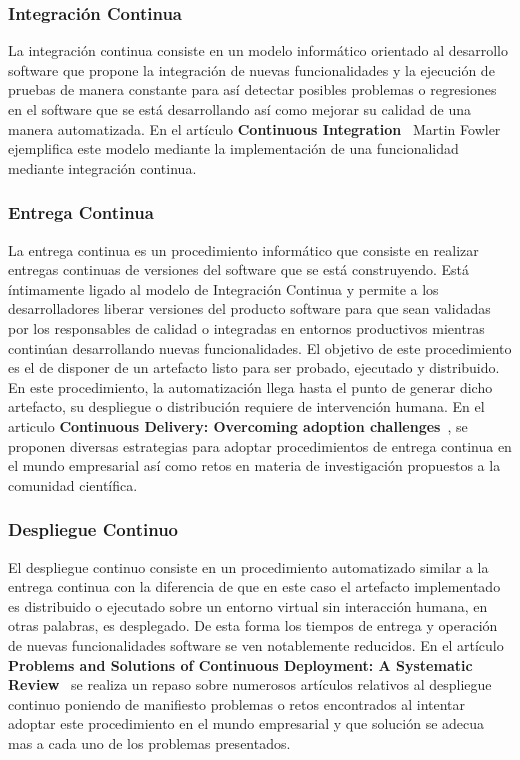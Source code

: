 \documentclass[a4paper,11pt]{book}
\begin{document}
\subsubsection{Integración Continua}
 
La integración continua consiste en un modelo informático orientado al desarrollo software que propone la integración de nuevas funcionalidades y la ejecución de pruebas de manera constante para así detectar posibles problemas o regresiones en el software que se está desarrollando así como mejorar su calidad de una manera automatizada. En el artículo \textbf{Continuous Integration}~\cite{ci}   Martin Fowler ejemplifica este modelo mediante la implementación de una funcionalidad mediante integración continua. 

\subsubsection{Entrega Continua}

La entrega continua es un procedimiento informático que consiste en realizar entregas continuas de versiones del software que se está construyendo. Está íntimamente ligado al modelo de Integración Continua y permite a los desarrolladores liberar versiones del producto software para que sean validadas por los responsables de calidad o integradas en entornos productivos mientras continúan desarrollando nuevas funcionalidades. El objetivo de este procedimiento es el de disponer de un artefacto listo para ser probado, ejecutado y distribuido.  En este procedimiento, la automatización llega hasta el punto de generar dicho artefacto, su despliegue o distribución requiere de intervención humana. En el articulo \textbf{Continuous Delivery: Overcoming adoption challenges}~\cite{cd}, se proponen diversas estrategias para adoptar procedimientos de entrega continua  en el mundo empresarial así como retos en materia de investigación propuestos a la comunidad científica. 

\subsubsection{Despliegue Continuo}

El despliegue continuo consiste en un procedimiento automatizado similar a la entrega continua con la diferencia de que en este caso el artefacto implementado es distribuido o ejecutado sobre un entorno virtual sin interacción humana, en otras palabras, es desplegado.  De esta forma los tiempos de entrega y operación de nuevas funcionalidades software se ven notablemente reducidos. En el artículo \textbf{Problems and Solutions of Continuous Deployment: A Systematic Review}~\cite{cdpl} se realiza un repaso sobre numerosos artículos relativos al despliegue continuo  poniendo de manifiesto problemas o retos encontrados al intentar adoptar este procedimiento en el mundo empresarial y que solución se adecua mas a cada uno de los problemas presentados. 
\end{document}
